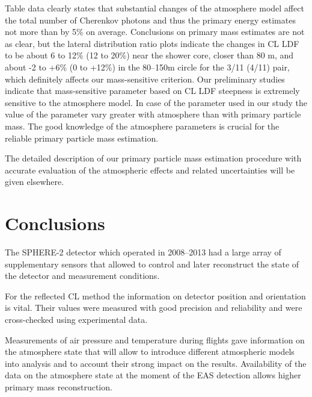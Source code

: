 \documentclass[preprint,5p,times]{elsarticle}
\begin{document}

Table data clearly states that substantial changes of the atmosphere model affect the total number of Cherenkov photons and thus the primary energy estimates not more than by 5\% on average. Conclusions on primary mass estimates are not as clear, but the lateral distribution ratio plots indicate the changes in CL LDF to be about 6 to 12\% (12 to 20\%) near the shower core, closer than 80 m, and about -2 to +6\% (0 to +12\%) in the 80--150m circle for the 3/11 (4/11) pair, which definitely affects our mass-sensitive criterion. Our preliminary studies indicate that mass-sensitive parameter based on CL LDF steepness is extremely sensitive to the atmosphere model. In case of the parameter used in our study the value of the parameter vary greater with atmosphere than with primary particle mass. The good knowledge of the atmosphere parameters is crucial for the reliable primary particle mass estimation.

The detailed description of our primary particle mass estimation procedure with accurate evaluation of the atmospheric effects and related uncertainties will be given elsewhere. 


\section{Conclusions \label{sect:conclusions}}
The SPHERE-2 detector which operated in 2008--2013 had a large array of supplementary sensors that allowed to control and later reconstruct the state of the detector and measurement conditions. 

For the reflected CL method the information on detector position and orientation is vital. Their values were measured with good precision and reliability and were cross-checked using experimental data.

Measurements of air pressure and temperature during flights gave information on the atmosphere state that will allow to introduce different atmospheric models into analysis and to account their strong impact on the results. Availability of the data on the atmosphere state at the moment of the EAS detection allows higher primary mass reconstruction.
\end{document}
